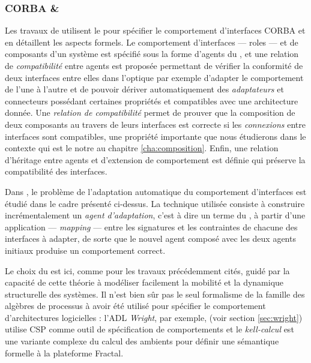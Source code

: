 \subsubsection{CORBA \& \pc}

Les travaux de \cite{refinepi,picorba} utilisent le
\pc pour sp\'ecifier le comportement d'interfaces CORBA et
\cite{canal-compat-arch} en d\'etaillent les aspects formels. Le
comportement d'interfaces --- roles --- et de composants d'un
syst\`eme est sp\'ecifi\'e sous la forme d'agents du \pc, et une
relation de \emph{compatibilit\'e} entre agents est propos\'ee
permettant de v\'erifier la conformit\'e de deux interfaces entre
elles dans l'optique par exemple d'adapter  le comportement de l'une
\`a l'autre et de pouvoir d\'eriver automatiquement des
\emph{adaptateurs} et connecteurs poss\'edant certaines
propri\'et\'es et compatibles avec une architecture donn\'ee.
Une \emph{relation de compatibilit\'e} permet de prouver que la composition de deux composants
au travers de leurs interfaces est correcte si les \emph{connexions}
entre interfaces sont compatibles, une propri\'et\'e importante que
nous \'etudierons dans le contexte qui est le notre au chapitre
\ref{cha:composition}. Enfin, une relation d'h\'eritage entre agents
et d'extension de comportement est d\'efinie qui pr\'eserve la
compatibilit\'e des interfaces. 

Dans \cite{bracciali-comp-adapt}, le probl\`eme de l'adaptation
automatique du comportement d'interfaces est \'etudi\'e dans le
cadre pr\'esent\'e ci-dessus. La technique utilis\'ee consiste \`a
construire incr\'ementalement un \emph{agent d'adaptation}, c'est \`a dire un terme du
\pc, \`a partir d'une application --- \emph{mapping} --- entre les
signatures et les contraintes de chacune des interfaces \`a adapter,
de sorte que le nouvel agent compos\'e avec les deux agents initiaux
produise un comportement correct.

Le choix du \pc est ici, comme pour les travaux
pr\'ec\'edemment cit\'es, guid\'e par la capacit\'e de cette
th\'eorie \`a mod\'eliser facilement la mobilit\'e et la dynamique
structurelle des syst\`emes. 
Il n'est bien s\^ur pas le seul formalisme de la famille des
alg\`ebres de processus \`a avoir \'et\'e utilis\'e pour
sp\'ecifier le comportement d'architectures logicielles : l'\textsf{ADL}
\emph{Wright}, par exemple, (voir  section \ref{sec:wright}) utilise
\textsf{CSP} comme outil de sp\'ecification de comportements et le
\emph{kell-calcul} est une variante complexe du calcul des ambients pour
d\'efinir une s\'emantique formelle \`a la plateforme \textsf{Fractal}.
 
